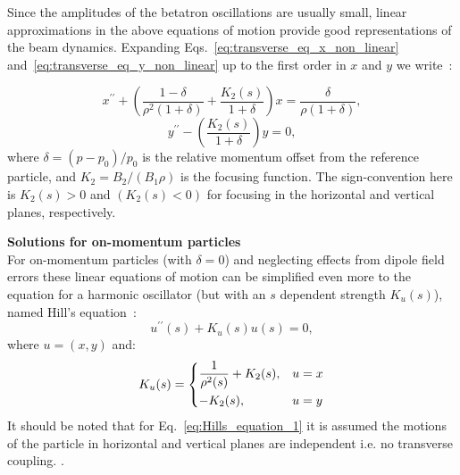 Since the amplitudes of the betatron oscillations are usually small, linear approximations in the above equations of motion provide good representations of the beam dynamics. Expanding Eqs.~\eqref{eq:transverse_eq_x_non_linear} and~\eqref{eq:transverse_eq_y_non_linear} up to the first order in $x$ and $y$ we write~\cite{Lee:1425444}: %

\begin{equation}\label{eq:eq_of_motion_horizontal_linear}
    x^{\prime \prime} + \left (  \frac{1-\delta}{\rho^2 (1+\delta)}  + \frac{K_2(s)}{1+\delta} \right )x = \frac{\delta}{\rho (1+\delta)}, 
\end{equation}
\begin{equation}\label{eq:eq_of_motion_vertical_linear}
    y^{\prime \prime} -  \left ( \frac{K_2(s)}{1+\delta} \right ) y = 0,
\end{equation}
where $\delta = (p-p_0)/p_0$ is the relative momentum offset from the reference particle, and $K_2=B_2 /(B_1\rho)$ is the focusing function. The sign-convention here is $K_2(s)>0$ and $(K_2(s)<0)$ for focusing in the horizontal and vertical planes, respectively.

\textbf{Solutions for on-momentum particles}\\
For on-momentum particles (with $\delta=0$) and neglecting effects from dipole field errors %
these linear equations of motion can be simplified even more to the equation for a harmonic oscillator (but with an $s$ dependent strength $K_u(s)$), named Hill's equation~\cite{Lee:1425444}:
\begin{equation}\label{eq:Hills_equation_1}
    u^{\prime \prime}(s) + K_u(s) u(s) = 0,
\end{equation}
where $u=(x,y)$ and:
 \begin{equation}\label{eq:Hills_equation_2}
    K_u(s) = \begin{dcases}
        \frac{1}{\rho^2(s)}+K_2(s), & u=x \\
        -K_2(s), & u=y 
    \end{dcases}
\end{equation}
 It should be noted that for Eq.~\eqref{eq:Hills_equation_1} it is assumed the motions of the particle in horizontal and vertical planes are independent i.e. no transverse coupling.
 . %

